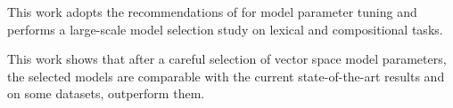 This work adopts the recommendations of  for model parameter tuning and performs a large-scale model selection study on lexical and compositional tasks.
%
%

This work shows that after a careful selection of  vector space model
parameters, the selected models are comparable with the current state-of-the-art results and on some datasets, outperform them.
%
%
%

